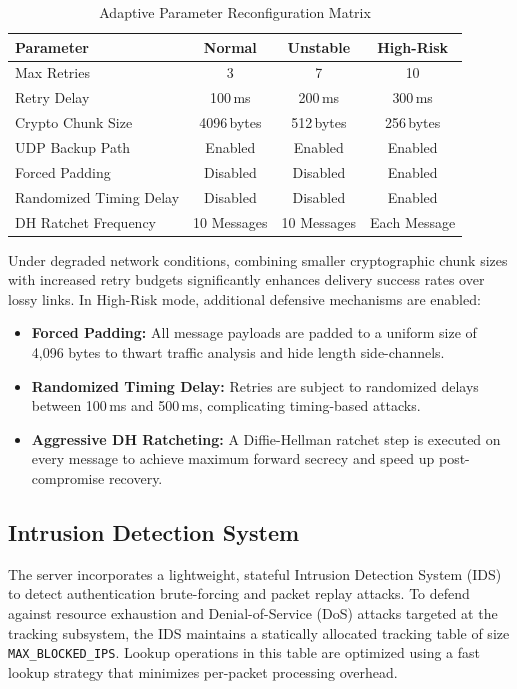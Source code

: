 \documentclass[conference]{IEEEtran}
\begin{document}
\begin{table}[t]
\caption{Adaptive Parameter Reconfiguration Matrix}
\label{tab:adaptive_params}
\begin{center}
\begin{tabular}{|l|c|c|c|}
\hline
\textbf{Parameter} & \textbf{Normal} & \textbf{Unstable} & \textbf{High-Risk} \\
\hline
Max Retries & 3 & 7 & 10 \\
Retry Delay & 100\,ms & 200\,ms & 300\,ms \\
Crypto Chunk Size & 4096\,bytes & 512\,bytes & 256\,bytes \\
UDP Backup Path & Enabled & Enabled & Enabled \\
Forced Padding & Disabled & Disabled & Enabled \\
Randomized Timing Delay & Disabled & Disabled & Enabled \\
DH Ratchet Frequency & 10 Messages & 10 Messages & Each Message \\
\hline
\end{tabular}
\end{center}
\end{table}

Under degraded network conditions, combining smaller cryptographic chunk sizes with increased retry budgets significantly enhances delivery success rates over lossy links. In High-Risk mode, additional defensive mechanisms are enabled:
\begin{itemize}
    \item \textbf{Forced Padding:} All message payloads are padded to a uniform size of 4,096 bytes to thwart traffic analysis and hide length side-channels.
    \item \textbf{Randomized Timing Delay:} Retries are subject to randomized delays between 100\,ms and 500\,ms, complicating timing-based attacks.
    \item \textbf{Aggressive DH Ratcheting:} A Diffie-Hellman ratchet step is executed on every message to achieve maximum forward secrecy and speed up post-compromise recovery.
\end{itemize}

\subsection{Intrusion Detection System}

The server incorporates a lightweight, stateful Intrusion Detection System (IDS) to detect authentication brute-forcing and packet replay attacks. To defend against resource exhaustion and Denial-of-Service (DoS) attacks targeted at the tracking subsystem, the IDS maintains a statically allocated tracking table of size \texttt{MAX\_BLOCKED\_IPS}. Lookup operations in this table are optimized using a fast lookup strategy that minimizes per-packet processing overhead.
\end{document}
